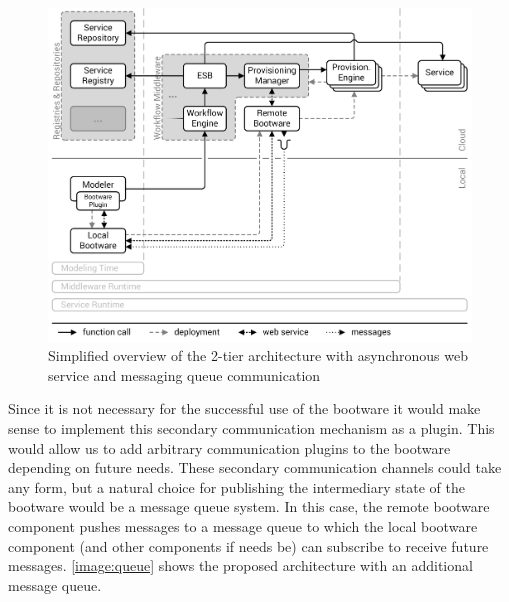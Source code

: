 \begin{figure}[!htbp]
	\centering
	\includegraphics[resolution=600]{design/assets/simple_queue}
	\caption{Simplified overview of the 2-tier architecture with asynchronous web service and messaging queue communication}
	\label{image:queue}
\end{figure}

Since it is not necessary for the successful use of the bootware it would make sense to implement this secondary communication mechanism as a plugin.
This would allow us to add arbitrary communication plugins to the bootware depending on future needs.
These secondary communication channels could take any form, but a natural choice for publishing the intermediary state of the bootware would be a message queue system.
In this case, the remote bootware component pushes messages to a message queue to which the local bootware component (and other components if needs be) can subscribe to receive future messages.
\autoref{image:queue} shows the proposed architecture with an additional message queue.
